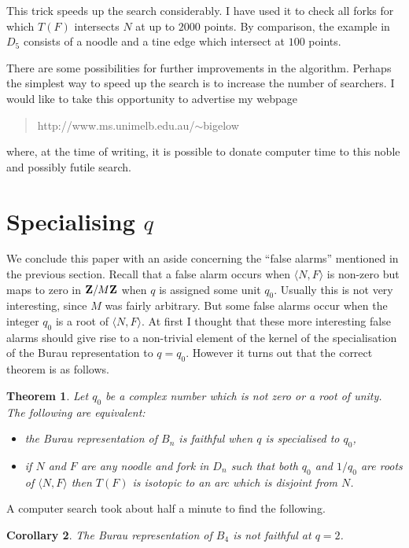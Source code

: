 \documentclass[10pt]{amsart}
\theoremstyle{plain}
\newtheorem{thm}{Theorem}[section]
\newtheorem{cor}[thm]{Corollary}
\theoremstyle{definition}
\newcommand{\Z}{{\bf{Z}}}
\begin{document}
This trick speeds up the search considerably.
I have used it to check all forks for which $T(F)$ intersects $N$ at
up to $2000$ points.
By comparison, the example in $D_5$
consists of a noodle and a tine edge
which intersect at $100$ points.

There are some possibilities for further improvements in the algorithm.
Perhaps the simplest way to speed up the search
is to increase the number of searchers.
I would like to take this opportunity
to advertise my webpage
\begin{quote}
http://www.ms.unimelb.edu.au/$\sim$bigelow
\end{quote}
where, at the time of writing,
it is possible to donate computer time to this
noble and possibly futile search.

\section{Specialising $q$}

We conclude this paper with an aside
concerning the ``false alarms'' mentioned in the previous section.
Recall that a false alarm occurs when
$\langle N,F \rangle$ is non-zero
but maps to zero in $\Z/M\Z$
when $q$ is assigned some unit $q_0$.
Usually this is not very interesting,
since $M$ was fairly arbitrary.
But some false alarms occur
when the integer $q_0$ is a root of $\langle N,F \rangle$.
At first I thought that these more interesting false alarms
should give rise to a non-trivial element of the kernel
of the specialisation of the Burau representation to $q=q_0$.
However it turns out that the correct theorem is as follows.

\begin{thm}
\label{special}
Let $q_0$ be a complex number
which is not zero or a root of unity.
The following are equivalent:
\begin{itemize}
\item the Burau representation of $B_n$ is faithful
  when $q$ is specialised to $q_0$,
\item if $N$ and $F$ are any noodle and fork in $D_n$
  such that both $q_0$ and $1/q_0$ are roots of $\langle N,F \rangle$
  then $T(F)$ is isotopic to an arc which is disjoint from $N$.
\end{itemize}
\end{thm}

A computer search took about half a minute to find the following.

\begin{cor}
The Burau representation of $B_4$
is not faithful at $q=2$.
\end{cor}
\end{document}
